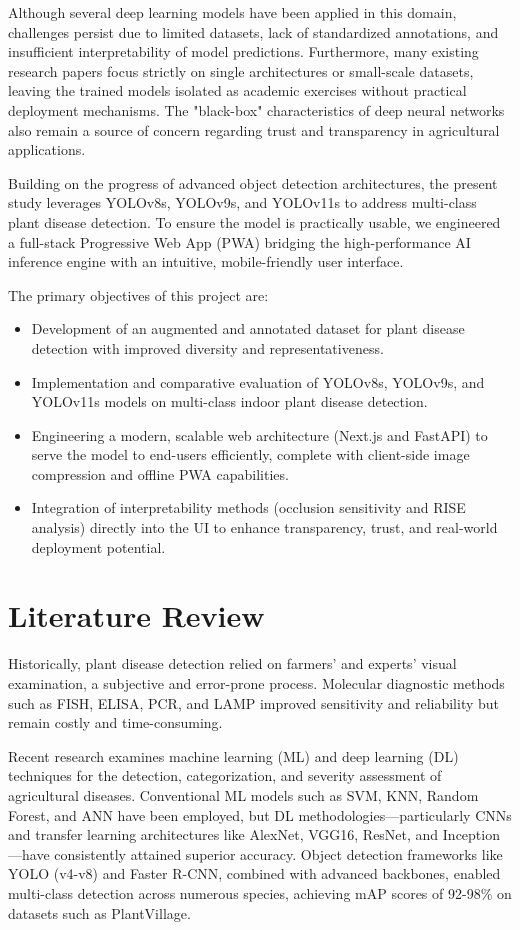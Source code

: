 \documentclass[12pt, a4paper]{article}
\begin{document}
Although several deep learning models have been applied in this domain, challenges persist due to limited datasets, lack of standardized annotations, and insufficient interpretability of model predictions. Furthermore, many existing research papers focus strictly on single architectures or small-scale datasets, leaving the trained models isolated as academic exercises without practical deployment mechanisms. The "black-box" characteristics of deep neural networks also remain a source of concern regarding trust and transparency in agricultural applications.

Building on the progress of advanced object detection architectures, the present study leverages YOLOv8s, YOLOv9s, and YOLOv11s to address multi-class plant disease detection. To ensure the model is practically usable, we engineered a full-stack Progressive Web App (PWA) bridging the high-performance AI inference engine with an intuitive, mobile-friendly user interface. 

The primary objectives of this project are:
\begin{itemize}
    \item Development of an augmented and annotated dataset for plant disease detection with improved diversity and representativeness.
    \item Implementation and comparative evaluation of YOLOv8s, YOLOv9s, and YOLOv11s models on multi-class indoor plant disease detection.
    \item Engineering a modern, scalable web architecture (Next.js and FastAPI) to serve the model to end-users efficiently, complete with client-side image compression and offline PWA capabilities.
    \item Integration of interpretability methods (occlusion sensitivity and RISE analysis) directly into the UI to enhance transparency, trust, and real-world deployment potential.
\end{itemize}

\section{Literature Review}
Historically, plant disease detection relied on farmers' and experts' visual examination, a subjective and error-prone process. Molecular diagnostic methods such as FISH, ELISA, PCR, and LAMP improved sensitivity and reliability but remain costly and time-consuming. 

Recent research examines machine learning (ML) and deep learning (DL) techniques for the detection, categorization, and severity assessment of agricultural diseases. Conventional ML models such as SVM, KNN, Random Forest, and ANN have been employed, but DL methodologies—particularly CNNs and transfer learning architectures like AlexNet, VGG16, ResNet, and Inception—have consistently attained superior accuracy. Object detection frameworks like YOLO (v4-v8) and Faster R-CNN, combined with advanced backbones, enabled multi-class detection across numerous species, achieving mAP scores of 92-98\% on datasets such as PlantVillage.
\end{document}
